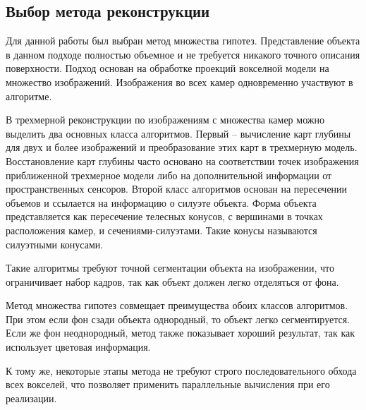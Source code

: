 \subsection{Выбор метода реконструкции}
Для данной работы был выбран метод множества гипотез. Представление объекта в данном подходе полностью объемное и не требуется никакого точного описания поверхности.  Подход основан на обработке проекций вокселной модели на множество изображений.  Изображения во всех камер одновременно участвуют в алгоритме.

В трехмерной реконструкции по изображениям с множества камер можно выделить два основных класса алгоритмов. Первый – вычисление карт глубины для двух и более изображений и преобразование этих карт в трехмерную модель. Восстановление карт глубины часто основано на соответствии точек изображения приближенной трехмерное модели либо на дополнительной информации от пространственных сенсоров. Второй класс алгоритмов основан на пересечении объемов и ссылается на информацию о силуэте объекта. Форма объекта представляется как пересечение телесных конусов, с вершинами в точках расположения камер, и сечениями-силуэтами. Такие конусы называются силуэтными конусами. 

Такие алгоритмы требуют точной сегментации объекта на изображении, что ограничивает набор кадров, так как объект должен легко отделяться от фона.

Метод множества гипотез совмещает преимущества обоих классов алгоритмов. При этом если фон сзади объекта однородный, то объект легко сегментируется. Если же фон неоднородный, метод также показывает хороший результат, так как использует цветовая информация.

К тому же, некоторые этапы метода не требуют строго последовательного обхода всех вокселей, что позволяет применить параллельные вычисления при его реализации.
